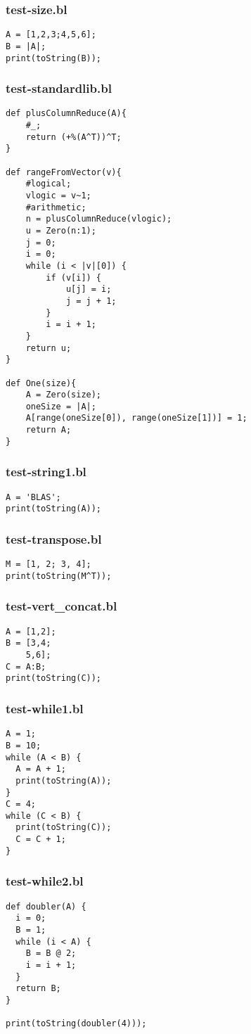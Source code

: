 \subsubsection{test-size.bl}
\begin{lstlisting}
A = [1,2,3;4,5,6];
B = |A|;
print(toString(B));\end{lstlisting}
\subsubsection{test-standardlib.bl}
\begin{lstlisting}
def plusColumnReduce(A){
    #_;
    return (+%(A^T))^T;
}

def rangeFromVector(v){
    #logical;
    vlogic = v~1;
    #arithmetic;
    n = plusColumnReduce(vlogic);
    u = Zero(n:1);
    j = 0;
    i = 0;
    while (i < |v|[0]) {
        if (v[i]) {
            u[j] = i;
            j = j + 1;
        }
        i = i + 1;
    }
    return u;
}

def One(size){
    A = Zero(size);
    oneSize = |A|;
    A[range(oneSize[0]), range(oneSize[1])] = 1;
    return A;
}
\end{lstlisting}
\subsubsection{test-string1.bl}
\begin{lstlisting}
A = 'BLAS';
print(toString(A));
\end{lstlisting}
\subsubsection{test-transpose.bl}
\begin{lstlisting}
M = [1, 2; 3, 4];
print(toString(M^T));\end{lstlisting}
\subsubsection{test-vert\_concat.bl}
\begin{lstlisting}
A = [1,2];
B = [3,4;
    5,6];
C = A:B;
print(toString(C));\end{lstlisting}
\subsubsection{test-while1.bl}
\begin{lstlisting}
A = 1;
B = 10;
while (A < B) {
  A = A + 1;
  print(toString(A));
}
C = 4;
while (C < B) {
  print(toString(C));
  C = C + 1;
}
\end{lstlisting}
\subsubsection{test-while2.bl}
\begin{lstlisting}
def doubler(A) {
  i = 0;
  B = 1;
  while (i < A) {
    B = B @ 2;
    i = i + 1;
  }
  return B;
}

print(toString(doubler(4)));\end{lstlisting}
